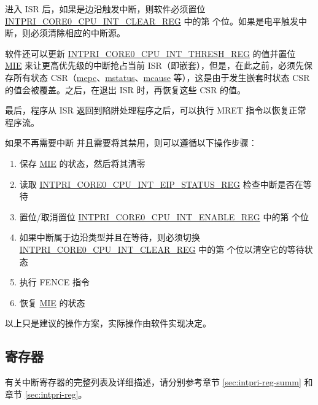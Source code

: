 \documentclass[main\_\_CN.tex]{subfiles}
\begin{document}
进入 ISR 后，如果是边沿触发中断，则软件必须置位 \hyperref[regdesc:INTPRICORE0CPUINTCLEARREG]{INTPRI\_CORE0\_CPU\_INT\_CLEAR\_REG} 中的第  个位。如果是电平触发中断，则必须清除相应的中断源。

软件还可以更新 \hyperref[regdesc:INTPRICORE0CPUINTTHRESHREG]{INTPRI\_CORE0\_CPU\_INT\_THRESH\_REG} 的值并置位 \hyperref[fielddesc:MSTATUSMIE]{MIE} 来让更高优先级的中断抢占当前 ISR（即嵌套），但是，在此之前，必须先保存所有状态 CSR（\hyperref[regdesc:MEPC]{mepc}、\hyperref[regdesc:MSTATUS]{mstatus}、\hyperref[regdesc:MCAUSE]{mcause} 等），这是由于发生嵌套时状态 CSR 的值会被覆盖。之后，在退出 ISR 时，再恢复这些 CSR 的值。

最后，程序从 ISR 返回到陷阱处理程序之后，可以执行 MRET 指令以恢复正常程序流。

如果不再需要中断  并且需要将其禁用，则可以遵循以下操作步骤：
\begin{enumerate}
    \item 保存 \hyperref[fielddesc:MSTATUSMIE]{MIE} 的状态，然后将其清零
    \item 读取 \hyperref[regdesc:INTPRICORE0CPUINTEIPSTATUSREG]{INTPRI\_CORE0\_CPU\_INT\_EIP\_STATUS\_REG} 检查中断是否在等待
    \item 置位/取消置位 \hyperref[regdesc:INTPRICORE0CPUINTENABLEREG]{INTPRI\_CORE0\_CPU\_INT\_ENABLE\_REG} 中的第  个位
    \item 如果中断属于边沿类型并且在等待，则必须切换 \hyperref[regdesc:INTPRICORE0CPUINTCLEARREG]{INTPRI\_CORE0\_CPU\_INT\_CLEAR\_REG} 中的第  个位以清空它的等待状态
    \item 执行 FENCE 指令
    \item 恢复 \hyperref[fielddesc:MSTATUSMIE]{MIE} 的状态
\end{enumerate}

以上只是建议的操作方案，实际操作由软件实现决定。


\hypertarget{riscvcpu-int-reg-summ}{}
\subsection{寄存器}
\label{sec:riscvcpu-int-reg-summ}

有关中断寄存器的完整列表及详细描述，请分别参考章节 \ref{sec:intpri-reg-summ} 和章节 \ref{sec:intpri-reg}。

\end{document}
